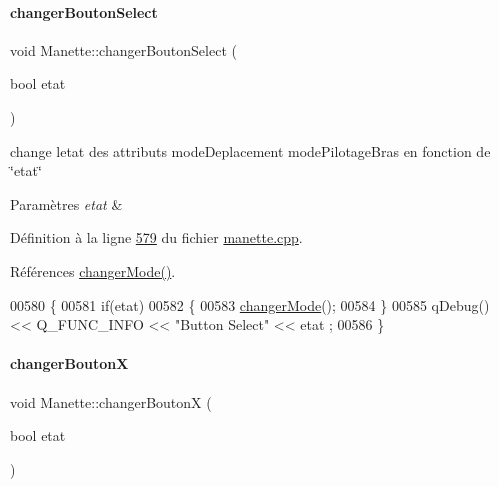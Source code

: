 \paragraph{\texorpdfstring{changer\+Bouton\+Select}{changerBoutonSelect}}
{\footnotesize\ttfamily void Manette\+::changer\+Bouton\+Select (\begin{DoxyParamCaption}\item[{bool}]{etat }\end{DoxyParamCaption})\hspace{0.3cm}{\ttfamily [slot]}}



change l\textquotesingle{}etat des attributs mode\+Deplacement mode\+Pilotage\+Bras en fonction de \char`\"{}etat\char`\"{} 


\begin{DoxyParams}{Paramètres}
{\em etat} & \\
\hline
\end{DoxyParams}


Définition à la ligne \hyperlink{manette_8cpp_source_l00579}{579} du fichier \hyperlink{manette_8cpp_source}{manette.\+cpp}.



Références \hyperlink{manette_8cpp_source_l00407}{changer\+Mode()}.


\begin{DoxyCode}
00580 \{
00581     \textcolor{keywordflow}{if}(etat)
00582     \{
00583         \hyperlink{class_manette_a202faf093876b9e95cfc316b552c59c3}{changerMode}();
00584     \}
00585     qDebug() << Q\_FUNC\_INFO << \textcolor{stringliteral}{"Button Select"} << etat ;
00586 \}
\end{DoxyCode}
\mbox{\label{class_manette_a5d9f34f3ec334fa3880d93175f0df152}} 
\paragraph{\texorpdfstring{changer\+BoutonX}{changerBoutonX}}
{\footnotesize\ttfamily void Manette\+::changer\+BoutonX (\begin{DoxyParamCaption}\item[{bool}]{etat }\end{DoxyParamCaption})\hspace{0.3cm}{\ttfamily [slot]}}



